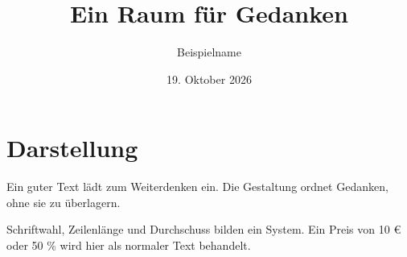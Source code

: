 \documentclass[12pt,a4paper,ngerman,DIV=12,BCOR=0mm,twoside]{scrartcl}
\title{Ein Raum für Gedanken}
\author{Beispielname}
\date{19. Oktober 2026}
\begin{document}
\RaggedRight
\maketitle
\section*{Darstellung}
Ein guter Text lädt zum Weiterdenken ein. Die Gestaltung ordnet Gedanken, ohne sie zu überlagern.

Schriftwahl, Zeilenlänge und Durchschuss bilden ein System. Ein Preis von 10 € oder 50 \% wird hier als normaler Text behandelt.
\end{document}
